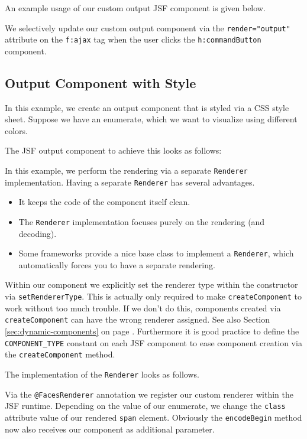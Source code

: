 An example usage of our custom output JSF component is given below.

We selectively update our custom output component via the \texttt{render="output"} attribute on the \texttt{f:ajax} tag when the user clicks the \texttt{h:commandButton} component.

\subsection{Output Component with Style}

In this example, we create an output component that is styled via a CSS style sheet.
Suppose we have an enumerate, which we want to visualize using different colors.


The JSF output component to achieve this looks as follows:

In this example, we perform the rendering via a separate \texttt{Renderer} implementation.
Having a separate \texttt{Renderer} has several advantages.
\begin{itemize}
	\item It keeps the code of the component itself clean.
	\item The \texttt{Renderer} implementation focuses purely on the rendering (and decoding).
	\item Some frameworks provide a nice base class to implement a \texttt{Renderer}, which automatically forces you to have a separate rendering.
\end{itemize}
Within our component we explicitly set the renderer type within the constructor via \texttt{setRendererType}.
This is actually only required to make \texttt{createComponent} to work without too much trouble.
If we don't do this, components created via \texttt{createComponent} can have the wrong renderer assigned.
See also Section \ref{sec:dynamic-components}  on page \pageref{sec:dynamic-components}.
Furthermore it is good practice to define the \texttt{COMPONENT\_TYPE} constant on each JSF component to ease component creation via the \texttt{createComponent} method.

The implementation of the \texttt{Renderer} looks as follows.

Via the \texttt{@FacesRenderer} annotation we register our custom renderer within the JSF runtime.
Depending on the value of our enumerate, we change the \texttt{class} attribute value of our rendered \texttt{span} element.
Obviously the \texttt{encodeBegin} method now also receives our component as additional parameter.


